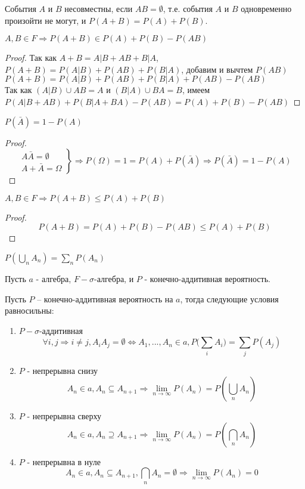 \begin{definition}
 События $A$ и $B$ несовместны, если $AB = \emptyset$, т.е. события $A$ и $B$ одновременно произойти не могут, и $P(A+B) = P(A)+P(B)$.
\end{definition}
\begin{corollary}
 $A, B \in F \Rightarrow P(A+B) \in P(A)+P(B)-P(AB)$
\end{corollary}
\begin{proof}
 Так как $A+B=A|B+AB+B|A$,\\
 $P(A+B) = P(A|B)+P(AB)+P(B|A)$, добавим и вычтем $P(AB)$\\
 $P(A+B) = P(A|B)+P(AB)+P(B|A)+P(AB)-P(AB)$\\
 Так как $(A|B) \cup AB=A$ и $(B|A) \cup BA=B$, имеем\\
 $P(A|B+AB)+P(B|A+BA)-P(AB)=P(A)+P(B)-P(AB)$
\end{proof}
\begin{corollary}
 $P(\bar{A}) = 1 - P(A)$
\end{corollary}
\begin{proof}
\begin{displaymath}
\left. \begin{array}{r}
A \bar{A} = \emptyset\\
A+\bar{A} = \Omega
\end{array} \right\} \Rightarrow P(\Omega) = 1 = P(A)+P(\bar{A}) \Rightarrow P(\bar{A}) = 1 - P(A)
\end{displaymath}
\end{proof}
\begin{corollary}
 $A, B \in F \Rightarrow P(A+B) \leq P(A) + P(B)$
\end{corollary}
\begin{proof}
$$P(A+B)  = P(A)+P(B) - P(AB) \leqslant P(A)+P(B)$$
\end{proof}
\begin{corollary}
 $P\left(\bigcup\limits_n A_n\right) = \sum\limits_n P\left(A_n\right)$
\end{corollary}
Пусть $a$ - алгебра, $F - \sigma$-алгебра, и $P$ - конечно-аддитивная вероятность.
\begin{theorem}
 Пусть $P$ -- конечно-аддитивная вероятность на $a$, тогда следующие условия равносильны:
 \begin{enumerate}
  \item $P - \sigma$-аддитивная
  $$\forall i,j\Rightarrow i\ne j, A_{i}A_{j}=\emptyset \Leftrightarrow A_1,...,A_n \in a, P\big (\sum\limits_i A_i\big ) = \sum\limits_j P(A_j)$$
 \item $P$ - непрерывна снизу
 $$A_n \in a, A_n \subseteq A_{n+1} \Rightarrow \lim\limits_{n\rightarrow\infty} P\left(A_n\right) = P\left(\bigcup\limits_n A_n\right)$$
 \item $P$ - непрерывна сверху
 $$A_n \in a, A_n \supseteq A_{n+1} \Rightarrow \lim\limits_{n\rightarrow\infty} P\left(A_n\right) = P\left(\bigcap\limits_n A_n\right)$$
 \item $P$ - непрерывна в нуле
 $$A_n \in a, A_n \subseteq A_{n+1}, \bigcap\limits_n A_n = \emptyset \Rightarrow \lim\limits_{n\rightarrow\infty} P\left(A_n\right) = 0$$
 \end{enumerate}
\end{theorem}
